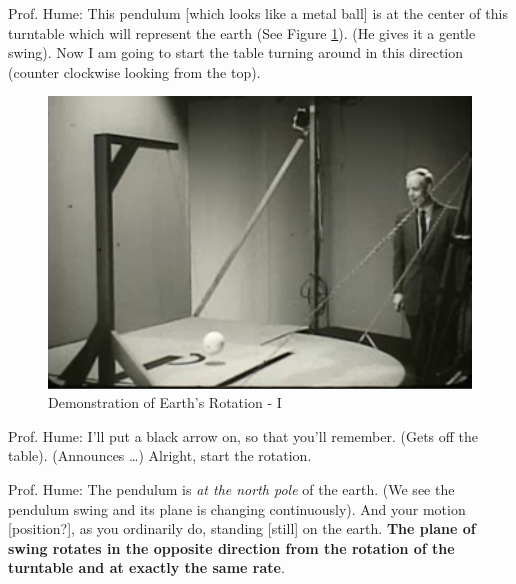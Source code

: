 \documentclass[a6paper]{article}
\begin{document}
Prof. Hume: This pendulum [which looks like a metal ball] is at the center of this turntable which will represent the earth (See Figure \ref{fig: foucault-pendulum-1}). (He gives it a gentle swing). Now I am going to start the table turning around in this direction (counter clockwise looking from the top).
        \begin{figure}[h!]
            \centering
            \includegraphics[width=0.5\linewidth]{foucault-pendulum-1.png}
            \caption{Demonstration of Earth's Rotation - I}
            \label{fig: foucault-pendulum-1}
        \end{figure}

Prof. Hume: I'll put a black arrow on, so that you'll remember. (Gets off the table). (Announces \dots) Alright, start the rotation.

Prof. Hume: The pendulum is \emph{at the north pole} of the earth. (We see the pendulum swing and its plane is changing continuously). And your motion [position?], as you ordinarily do, standing [still] on the earth. \textbf{The plane of swing rotates in the opposite direction from the rotation of the turntable and at exactly the same rate}.
\end{document}
